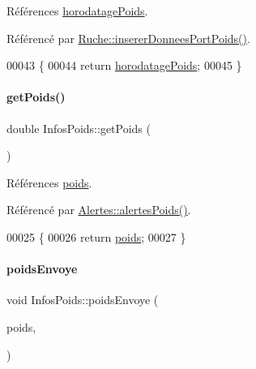 Références \hyperlink{class_infos_poids_a6cff463552adfdde9430073a87878494}{horodatage\+Poids}.



Référencé par \hyperlink{class_ruche_a923f42fc4878a01f6102966a748e8f37}{Ruche\+::inserer\+Donnees\+Port\+Poids()}.


\begin{DoxyCode}
00043 \{
00044     \textcolor{keywordflow}{return} \hyperlink{class_infos_poids_a6cff463552adfdde9430073a87878494}{horodatagePoids};
00045 \}
\end{DoxyCode}
\mbox{\label{class_infos_poids_a902fb0222d3b2fa396987daed57377d2}} 
\paragraph{\texorpdfstring{get\+Poids()}{getPoids()}}
{\footnotesize\ttfamily double Infos\+Poids\+::get\+Poids (\begin{DoxyParamCaption}{ }\end{DoxyParamCaption})}



Références \hyperlink{class_infos_poids_ac5faebb99bd0f87f96b442f10349cbd8}{poids}.



Référencé par \hyperlink{class_alertes_ac4b8925cc6c262cf7254b1576ba07d33}{Alertes\+::alertes\+Poids()}.


\begin{DoxyCode}
00025 \{
00026     \textcolor{keywordflow}{return} \hyperlink{class_infos_poids_ac5faebb99bd0f87f96b442f10349cbd8}{poids};
00027 \}
\end{DoxyCode}
\mbox{\label{class_infos_poids_a3c4ca9068911e45d0207de051ef5b402}} 
\paragraph{\texorpdfstring{poids\+Envoye}{poidsEnvoye}}
{\footnotesize\ttfamily void Infos\+Poids\+::poids\+Envoye (\begin{DoxyParamCaption}\item[{const double}]{poids,  }\item[{Q\+String}]{ }\end{DoxyParamCaption})\hspace{0.3cm}{\ttfamily [signal]}}



